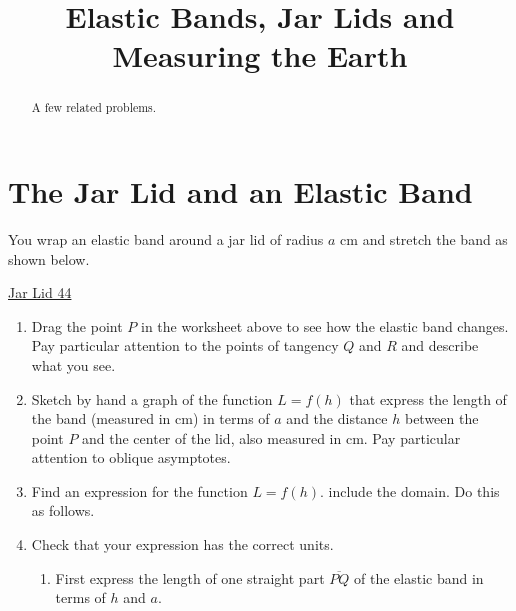\documentclass{ximera}
\title{Elastic Bands, Jar Lids and Measuring the Earth}
\begin{document}
\begin{abstract}
A few related problems.
\end{abstract}
\maketitle

\section{The Jar Lid and an Elastic Band}
\begin{question} \label{4Ef4tDE}

You wrap an elastic band around a jar lid of radius $a$ cm and stretch the band as shown below.

\begin{onlineOnly}
    \begin{center}
\end{center}
\end{onlineOnly}

\href{https://www.desmos.com/calculator/ymesxpazea}{Jar Lid 44}

\begin{enumerate}

\item Drag the point $P$ in the worksheet above to see how the elastic band changes. Pay particular attention to the points of tangency $Q$ and $R$ and describe what you see.

\begin{freeResponse}
\end{freeResponse}

\item Sketch by hand a graph of the function $L=f(h)$ that express the length of the band (measured in cm) in terms of $a$ and the distance $h$ between the point $P$ and the center of the lid, also measured in cm. Pay particular attention to oblique asymptotes.

\item Find an expression for the function $L=f(h)$. include the domain. Do this as follows.

\item Check that your expression has the correct units.
\begin{freeResponse}
\end{freeResponse}

\begin{enumerate}
\item First express the length of one straight part $\overline{PQ}$ of the elastic band in terms of $h$ and $a$. 


\end{enumerate}
\end{enumerate}
\end{question}
\end{document}
